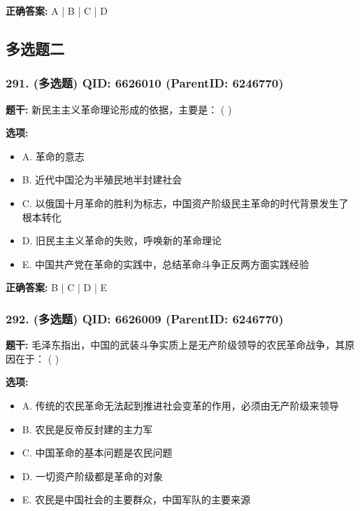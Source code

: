 \documentclass[12pt,UTF8]{ctexart}
\begin{document}
\textbf{正确答案:}
A | B | C | D

\vspace{0.3em}\hrulefill\vspace{0.7em}

\subsection*{多选题二}

\subsubsection*{291. (多选题) \small QID: 6626010 (ParentID: 6246770)}

\textbf{题干:}
新民主主义革命理论形成的依据，主要是： ( )



\textbf{选项:}
\begin{itemize}[leftmargin=*]

  \item A. 革命的意志

  \item B. 近代中国沦为半殖民地半封建社会

  \item C. 以俄国十月革命的胜利为标志，中国资产阶级民主革命的时代背景发生了根本转化

  \item D. 旧民主主义革命的失败，呼唤新的革命理论

  \item E. 中国共产党在革命的实践中，总结革命斗争正反两方面实践经验

\end{itemize}

\textbf{正确答案:}
B | C | D | E

\vspace{0.3em}\hrulefill\vspace{0.7em}

\subsubsection*{292. (多选题) \small QID: 6626009 (ParentID: 6246770)}

\textbf{题干:}
毛泽东指出，中国的武装斗争实质上是无产阶级领导的农民革命战争，其原因在于： ( )



\textbf{选项:}
\begin{itemize}[leftmargin=*]

  \item A. 传统的农民革命无法起到推进社会变革的作用，必须由无产阶级来领导

  \item B. 农民是反帝反封建的主力军

  \item C. 中国革命的基本问题是农民问题

  \item D. 一切资产阶级都是革命的对象

  \item E. 农民是中国社会的主要群众，中国军队的主要来源

\end{itemize}
\end{document}
